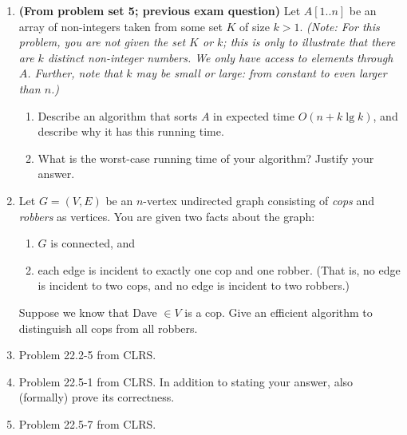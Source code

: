 \documentclass[letterpaper,11pt]{article}
\begin{document}
\begin{enumerate}

\item \textbf{(From problem set 5; previous exam question)} Let $A[1..n]$ be an array of non-integers taken from some set $K$ of size $k>1$. \emph{(Note: For this problem, you are not given the set $K$ or $k$; this is only to illustrate that there are $k$ distinct non-integer numbers. We only have access to elements through $A$. Further, note that $k$ may be small or large: from constant to even larger than $n$.)}
\begin{enumerate}
\item Describe an algorithm that sorts $A$ in expected time $O(n + k\lg k)$, and describe why it has this running time. 

\item What is the worst-case running time of your algorithm? Justify your answer.
\end{enumerate}

\item Let $G=(V,E)$ be an $n$-vertex undirected graph consisting of \emph{cops} and \emph{robbers} as vertices. You are given two facts about the graph:
\begin{enumerate}
\item $G$ is connected, and
\item each edge is incident to exactly one cop and one robber. (That is, no edge is incident to two cops, and no edge is incident to two robbers.)
\end{enumerate}
Suppose we know that Dave $\in V$ is a cop. Give an efficient algorithm to distinguish all cops from all robbers.


\item Problem 22.2-5 from CLRS.

\item Problem 22.5-1 from CLRS. In addition to stating your answer, also (formally) prove its correctness.

\item Problem 22.5-7 from CLRS.


\end{enumerate}
\end{document}
